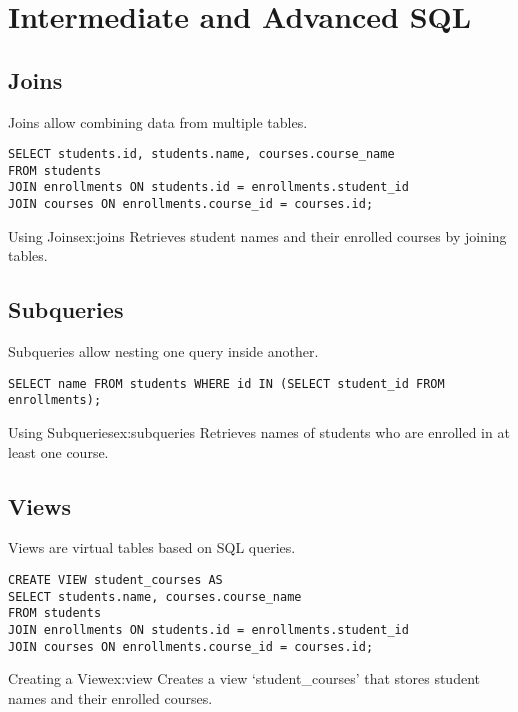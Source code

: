 \chapter{Intermediate and Advanced SQL}

\section{Joins}

Joins allow combining data from multiple tables.

\begin{verbatim}
SELECT students.id, students.name, courses.course_name 
FROM students 
JOIN enrollments ON students.id = enrollments.student_id 
JOIN courses ON enrollments.course_id = courses.id;
\end{verbatim}

\begin{exampletcb}{Using Joins}{ex:joins}
Retrieves student names and their enrolled courses by joining tables.
\end{exampletcb}

\section{Subqueries}

Subqueries allow nesting one query inside another.

\begin{verbatim}
SELECT name FROM students WHERE id IN (SELECT student_id FROM enrollments);
\end{verbatim}

\begin{exampletcb}{Using Subqueries}{ex:subqueries}
Retrieves names of students who are enrolled in at least one course.
\end{exampletcb}

\section{Views}

Views are virtual tables based on SQL queries.

\begin{verbatim}
CREATE VIEW student_courses AS 
SELECT students.name, courses.course_name 
FROM students 
JOIN enrollments ON students.id = enrollments.student_id 
JOIN courses ON enrollments.course_id = courses.id;
\end{verbatim}

\begin{exampletcb}{Creating a View}{ex:view}
Creates a view `student\_courses' that stores student names and their enrolled courses.
\end{exampletcb}

